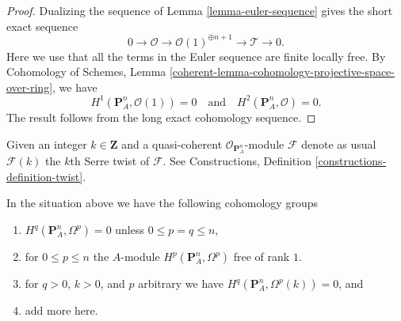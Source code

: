 \begin{proof}
Dualizing the sequence of Lemma \ref{lemma-euler-sequence} gives
the short exact sequence
$$
0 \to \mathcal{O} \to \mathcal{O}(1)^{\oplus n + 1}
\to \mathcal{T} \to 0.
$$
Here we use that all the terms in the Euler sequence are finite locally
free. By Cohomology of Schemes, Lemma
\ref{coherent-lemma-cohomology-projective-space-over-ring}, we have
$$
H^1(\mathbf{P}^n_A, \mathcal{O}(1)) = 0
\quad\text{and}\quad
H^2(\mathbf{P}^n_A, \mathcal{O}) = 0.
$$
The result follows from the long exact cohomology sequence.
\end{proof}

\noindent
Given an integer $k \in \mathbf{Z}$ and a quasi-coherent
$\mathcal{O}_{\mathbf{P}^n_A}$-module $\mathcal{F}$
denote as usual $\mathcal{F}(k)$ the $k$th Serre twist of $\mathcal{F}$.
See Constructions, Definition \ref{constructions-definition-twist}.

\begin{lemma}
\label{lemma-twisted-hodge-cohomology-projective-space}
In the situation above we have the following cohomology groups
\begin{enumerate}
\item $H^q(\mathbf{P}^n_A, \Omega^p) = 0$
unless $0 \leq p = q \leq n$,
\item for $0 \leq p \leq n$ the $A$-module
$H^p(\mathbf{P}^n_A, \Omega^p)$ free of rank $1$.
\item for $q > 0$, $k > 0$, and $p$ arbitrary we have
$H^q(\mathbf{P}^n_A, \Omega^p(k)) = 0$, and
\item add more here.
\end{enumerate}
\end{lemma}

